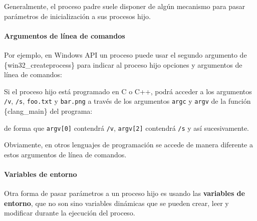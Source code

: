 Generalmente, el proceso padre suele disponer de algún mecanismo para
pasar parámetros de inicialización a sus procesos hijo.

\paragraph{Argumentos de línea de
comandos}\label{_argumentos_de_luxednea_de_comandos}

Por ejemplo, en Windows API un proceso puede usar el segundo argumento
de \{win32\_createprocess\} para indicar al proceso hijo opciones y
argumentos de línea de comandos:

\begin{Shaded}
\begin{Highlighting}[]
\OperatorTok{=}\OperatorTok{(}\SpecialCharTok{\textbackslash{}\textbackslash{}}\OperatorTok{,} \OperatorTok{,}  \OperatorTok{);}
\end{Highlighting}
\end{Shaded}

Si el proceso hijo está programado en C o C++, podrá acceder a los
argumentos \texttt{/v}, \texttt{/s}, \texttt{foo.txt} y \texttt{bar.png}
a través de los argumentos \texttt{argc} y \texttt{argv} de la función
\{clang\_main\} del programa:

\begin{Shaded}
\begin{Highlighting}[]
\OperatorTok{(}\OperatorTok{,} \OperatorTok{*}\OperatorTok{[])}
\OperatorTok{\{}
\OperatorTok{\}}
\end{Highlighting}
\end{Shaded}

de forma que \texttt{argv{[}0{]}} contendrá \texttt{/v},
\texttt{argv{[}2{]}} contendrá \texttt{/s} y así sucesivamente.

Obviamente, en otros lenguajes de programación se accede de manera
diferente a estos argumentos de línea de comandos.

\paragraph{Variables de entorno}\label{_variables_de_entorno}

Otra forma de pasar parámetros a un proceso hijo es usando las
\textbf{variables de entorno}, que no son sino variables dinámicas que
se pueden crear, leer y modificar durante la ejecución del proceso.

